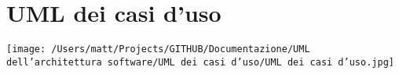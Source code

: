 \chapter{UML dei casi d'uso}

\texttt{[image: /Users/matt/Projects/GITHUB/Documentazione/UML dell'architettura software/UML dei casi d'uso/UML dei casi d’uso.jpg]}
